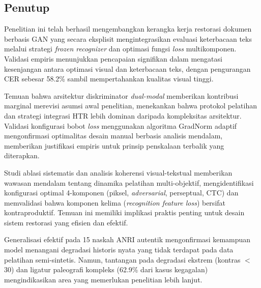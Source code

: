 \documentclass[12pt,a4paper]{article}
\begin{document}
\vspace{0.8em}

\subsection{Penutup}
\label{subsec:penutup}
\vspace{0.8em}

Penelitian ini telah berhasil mengembangkan kerangka kerja restorasi dokumen berbasis GAN yang secara eksplisit mengintegrasikan evaluasi keterbacaan teks melalui strategi \textit{frozen recognizer} dan optimasi fungsi \textit{loss} multikomponen. Validasi empiris menunjukkan pencapaian signifikan dalam mengatasi kesenjangan antara optimasi visual dan keterbacaan teks, dengan pengurangan CER sebesar 58.2\% sambil mempertahankan kualitas visual tinggi.

\vspace{0.8em}

Temuan bahwa arsitektur diskriminator \textit{dual-modal} memberikan kontribusi marginal merevisi asumsi awal penelitian, menekankan bahwa protokol pelatihan dan strategi integrasi HTR lebih dominan daripada kompleksitas arsitektur. Validasi konfigurasi bobot \textit{loss} menggunakan algoritma GradNorm adaptif mengonfirmasi optimalitas desain manual berbasis analisis mendalam, memberikan justifikasi empiris untuk prinsip penskalaan terbalik yang diterapkan.

\vspace{0.8em}

Studi ablasi sistematis dan analisis koherensi visual-tekstual memberikan wawasan mendalam tentang dinamika pelatihan multi-objektif, mengidentifikasi konfigurasi optimal 4-komponen (piksel, \textit{adversarial}, perseptual, CTC) dan memvalidasi bahwa komponen kelima (\textit{recognition feature loss}) bersifat kontraproduktif. Temuan ini memiliki implikasi praktis penting untuk desain sistem restorasi yang efisien dan efektif.

\vspace{0.8em}

Generalisasi efektif pada 15 naskah ANRI autentik mengonfirmasi kemampuan model menangani degradasi historis nyata yang tidak terdapat pada data pelatihan semi-sintetis. Namun, tantangan pada degradasi ekstrem (kontras $<$30) dan ligatur paleografi kompleks (62.9\% dari kasus kegagalan) mengindikasikan area yang memerlukan penelitian lebih lanjut.

\vspace{0.8em}
\end{document}
